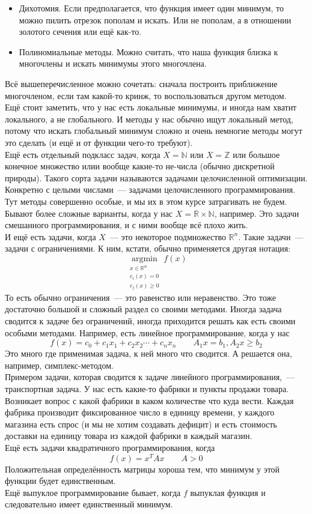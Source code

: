 \documentclass{article}
\begin{document}
    \begin{itemize}
        \item Дихотомия. Если предполагается, что функция имеет один минимум, то можно пилить отрезок пополам и искать. Или не пополам, а в отношении золотого сечения или ещё как-то.
        \item Полиномиальные методы. Можно считать, что наша функция близка к многочлены и искать минимумы этого многочлена.
    \end{itemize}
    Всё вышеперечисленное можно сочетать: сначала построить приближение многочленом, если там какой-то кринж, то воспользоваться другом методом.\\
    Ещё стоит заметить, что у нас есть локальные минимумы, и иногда нам хватит локального, а не глобального. И методы у нас обычно ищут локальный метод, потому что искать глобальный минимум сложно и очень немногие методы могут это сделать (и ещё и от функции чего-то требуют).\\
    Ещё есть отдельный подкласс задач, когда $X=\mathbb N$ или $X=\mathbb Z$ или большое конечное множество илии вообще какие-то не-числа (обычно дискретной природы). Такого сорта задачи называются задачами целочисленной оптимизации. Конкретно с целыми числами~--- задачами целочисленного программирования. Тут методы совершенно особые, и мы их в этом курсе затрагивать не будем.\\
    Бывают более сложные варианты, когда у нас $X=\mathbb R\times\mathbb N$, например. Это задачи смешанного программирования, и с ними вообще всё плохо жить.\\
    И ещё есть задачи, когда $X$~--- это некоторое подмножество $\mathbb R^n$. Такие задачи~--- задачи с ограничениями. К ним, кстати, обычно применяется другая нотация:
    $$
    \operatorname*{argmin}_{\substack{x\in\mathbb R^n\\c_i(x)=0\\c_j(x)\geqslant0}}f(x)
    $$
    То есть обычно ограничения~--- это равенство или неравенство. Это тоже достаточно большой и сложный раздел со своими методами. Иногда задача сводится к задаче без ограничений, иногда приходится решать как есть своими особыми методами. Например, есть линейное программирование, когда у нас
    $$
    f(x)=c_0+c_1x_1+c_2x_2\cdots+c_nx_n\qquad A_1x=b_1,A_2x\geqslant b_2
    $$
    Это много где применимая задача, к ней много что сводится. А решается она, например, симплекс-методом.\\
    Примером задачи, которая сводится к задаче линейного программирования,~--- транспортная задача. У нас есть какие-то фабрики и пункты продажи товара. Возникает вопрос с какой фабрики в каком количестве что куда вести. Каждая фабрика производит фиксированное число в единицу времени, у каждого магазина есть спрос (и мы не хотим создавать дефицит) и есть стоимость доставки на единицу товара из каждой фабрики в каждый магазин.\\
    Ещё есть задачи квадратичного программирования, когда
    $$
    f(x)=x^TAx\qquad A>0
    $$
    Положительная определённость матрицы хороша тем, что минимум у этой функции будет единственным.\\
    Ещё выпуклое программирование бывает, когда $f$ выпуклая функция и следовательно имеет единственный минимум.
\end{document}
